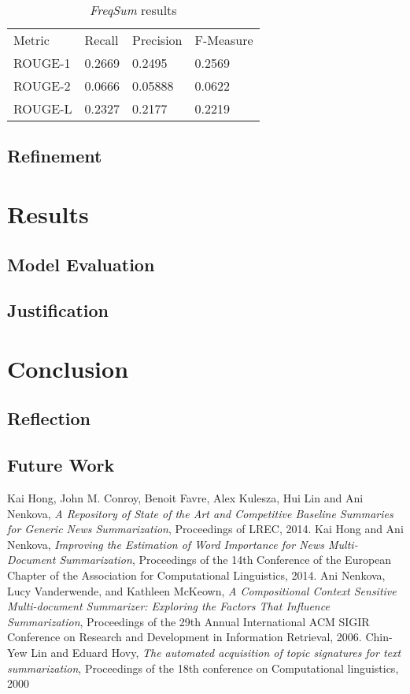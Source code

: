\documentclass{article}
\begin{document}
\begin{table}[h]
    \begin{tabular}{llll}
        Metric & Recall & Precision & F-Measure \\
        ROUGE-1 & 0.2669 & 0.2495 & 0.2569 \\
        ROUGE-2 & 0.0666 & 0.05888 & 0.0622 \\
        ROUGE-L & 0.2327 & 0.2177 &  0.2219
    \end{tabular}
    \caption{\emph{FreqSum} results}
    \label{table:freqresults}
\end{table}

\subsection{Refinement}

\section{Results}
\subsection{Model Evaluation}
\subsection{Justification}

\section{Conclusion}
\subsection{Reflection}
\subsection{Future Work}

\newpage
\begin{thebibliography}{99}
    Kai Hong, John M. Conroy, Benoit Favre, Alex Kulesza, Hui Lin and Ani Nenkova,
    \emph{A Repository of State of the Art and Competitive Baseline Summaries for Generic News Summarization},
    Proceedings of LREC, 2014.
    Kai Hong and Ani Nenkova,
    \emph{Improving the Estimation of Word Importance for News Multi-Document Summarization},
    Proceedings of the 14th Conference of the European Chapter of the Association for Computational Linguistics, 2014.
    Ani Nenkova, Lucy Vanderwende, and Kathleen McKeown,
    \emph{A Compositional Context Sensitive Multi-document Summarizer: Exploring the Factors That Influence Summarization},
    Proceedings of the 29th Annual International ACM SIGIR Conference on Research and Development in Information Retrieval, 2006.
    Chin-Yew Lin and Eduard Hovy,
    \emph{The automated acquisition of topic signatures for text summarization},
    Proceedings of the 18th conference on Computational linguistics,
    2000
\end{thebibliography}
\end{document}
